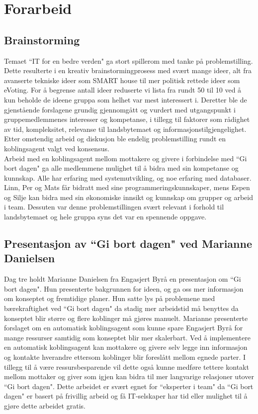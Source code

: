 \chapter{Forarbeid}
\section{Brainstorming}
Temaet ``IT for en bedre verden" ga stort spillerom med tanke på problemstilling. Dette resulterte i en kreativ brainstormingprosess med svært mange ideer, alt fra avanserte tekniske ideer som SMART house til mer politisk rettede ideer som eVoting. For å begrense antall ideer reduserte vi lista fra rundt 50 til 10 ved å kun beholde de ideene gruppa som helhet var mest interessert i. Deretter ble de gjenstående forslagene grundig gjennomgått og vurdert med utgangspunkt i gruppemedlemmenes interesser og kompetanse, i tillegg til faktorer som rådighet av tid, kompleksitet, relevanse til landsbytemaet og informasjonstilgjengelighet. Etter omstendig arbeid og diskusjon ble endelig problemstilling rundt en koblingsagent valgt ved konsensus.\\

Arbeid med en koblingsagent mellom mottakere og givere i forbindelse med ``Gi bort dagen" ga alle medlemmene mulighet til å bidra med sin kompetanse og kunnskap. Alle har erfaring med systemutvikling, og noe erfaring med databaser. Linn, Per og Mats får bidratt med sine programmeringskunnskaper, mens Espen og Silje kan bidra med sin økonomiske innsikt og kunnskap om grupper og arbeid i team. Dessuten var denne problemstillingen svært relevant i forhold til landsbytemaet og hele gruppa syns det var en spennende oppgave.\\

\section{Presentasjon av ``Gi bort dagen" ved Marianne Danielsen}
Dag tre holdt Marianne Danielsen fra Engasjert Byrå en presentasjon om ``Gi bort dagen". Hun presenterte bakgrunnen for ideen, og ga oss mer informasjon om konseptet og fremtidige planer. Hun satte lys på problemene med bærekraftighet ved ``Gi bort dagen" da stadig mer arbeidstid må benyttes da konseptet blir større og flere koblinger må gjøres manuelt. Marianne presenterte forslaget om en automatisk koblingsagent som kunne spare Engasjert Byrå for mange ressurser samtidig som konseptet blir mer skalerbart. Ved å implementere en automatisk koblingsagent kan mottakere og givere selv legge inn informasjon og kontakte hverandre ettersom koblinger blir foreslått mellom egnede parter. I tillegg til å være ressursbesparende vil dette også kunne medføre tettere kontakt mellom mottaker og giver som igjen kan bidra til mer langvarige relasjoner utover ``Gi bort dagen". Dette arbeidet er svært egnet for ``eksperter i team" da ``Gi bort dagen" er basert på frivillig arbeid og få IT-selskaper har tid eller mulighet til å gjøre dette arbeidet gratis.\\

